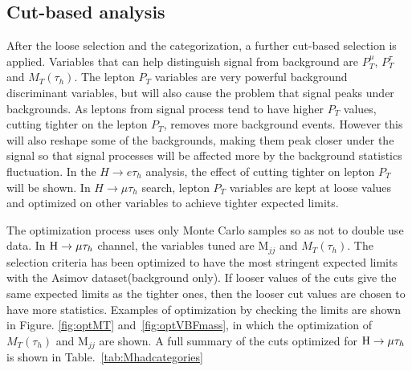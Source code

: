 \subsection{Cut-based analysis}
After the loose selection and the categorization, a further cut-based selection is applied. Variables that can help distinguish signal from background are $P_{T}^{\mu}$, $P_{T}^{\tau}$ and $M_{T}(\tau_{h})$. The lepton $P_{T}$ variables are very powerful background discriminant variables, but will also cause the problem that signal peaks under backgrounds. As leptons from signal process  tend to have higher $P_{T}$ values, cutting tighter on the lepton $P_{T}$, removes more background events. However this will also reshape some of the backgrounds, making them peak closer under the signal so that signal processes will be affected more by the background statistics fluctuation. In the $H\rightarrow e\tau_h$ analysis, the effect of cutting tighter on lepton $P_{T}$ will be shown. In $H\rightarrow\mu\tau_h$ search, lepton $P_{T}$ variables are kept at loose values and optimized on other variables to achieve tighter expected limits. 

The optimization process uses only Monte Carlo samples so as not to double use data. In $\mathrm{H}\to \mu\tau_{h}$  channel, the variables tuned are $\textrm{M}_{jj}$ and $M_{T}(\tau_{h})$. The selection criteria has been optimized to have the most stringent expected limits with the Asimov dataset(background only). If looser values of the cuts give the same expected limits as the tighter ones, then the looser cut values are chosen to have more statistics. Examples of optimization by checking the limits are shown in Figure. \ref{fig:optMT} and~\ref{fig:optVBFmass}, in which the optimization of $M_T(\tau_{h})$  and $\textrm{M}_{jj}$ are shown. A full summary of the cuts optimized for $\mathrm{H}\to \mu\tau_{h}$ is shown in Table.~\ref{tab:Mhadcategories}


